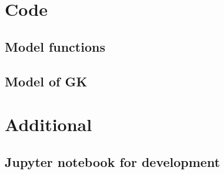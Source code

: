 
\appendixtoc
{}
\label{app:appendix}


%  
%
%


\chapter{Code}
\label{app:code}

\section{Model functions}

% 

\section{Model of GK}




\chapter{Additional}
\label{app:additional}

\section{Jupyter notebook for development}
\label{app:jupyter}